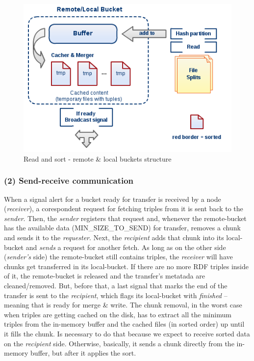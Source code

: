 \begin{figure}
\centering
\includegraphics[scale=0.6]{diag1}
\caption{Read and sort - remote & local buckets structure}
\end{figure}

% 
\subsubsection*{(2) Send-receive communication}

When a signal alert for a bucket ready for transfer is received by a node (\textit{receiver}), a corespondent request for fetching triples from it is sent back to the \textit{sender}. Then, the \textit{sender} registers that request and, whenever the remote-bucket has the available data (MIN\_SIZE\_TO\_SEND) for transfer, removes a chunk and sends it to the \textit{requester}. Next, the \textit{recipient} adds that chunk into its local-bucket and \textit{sends} a request for another fetch. As long as on the other side (\textit{sender's} side) the remote-bucket still contains triples, the \textit{receiver} will have chunks get transferred in its local-bucket. If there are no more RDF triples inside of it, the remote-bucket is released and the transfer's metatada are cleaned/removed. But, before that, a last signal that marks the end of the transfer is sent to the \textit{recipient}, which flags its local-bucket with \textit{finished} -- meaning that is ready for merge \& write. The chunk removal, in the worst case when triples are getting cached on the disk, has to extract all the minimum triples from the in-memory buffer and the cached files (in sorted order) up until it fills the chunk. Is necessary to do that because we expect to receive sorted data on the \textit{recipient} side. Otherwise, basically, it sends a chunk directly from the in-memory buffer, but after it applies the sort.

